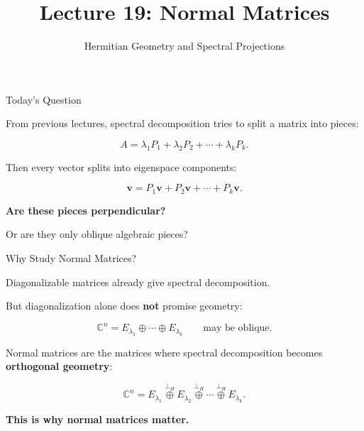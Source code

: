 \documentclass[10pt]{beamer}
\title{Lecture 19: Normal Matrices}
\subtitle{Hermitian Geometry and Spectral Projections}
\date{}
\theoremstyle{definition}
\newcommand{\x}[1]{\alert{\textbf{#1}}}
\newcommand{\orthoplus}{\mathbin{\overset{\perp_H}{\oplus}}}
\begin{document}
\begin{frame}[plain,shrink=10]
\titlepage
\end{frame}


\begin{frame}{Today's Question}

From previous lectures, spectral decomposition tries to split a matrix into pieces:

$$
A=\lambda_1P_1+\lambda_2P_2+\cdots+\lambda_kP_k.
$$

\vfill

Then every vector splits into eigenspace components:

$$
\mathbf{v}=P_1\mathbf{v}+P_2\mathbf{v}+\cdots+P_k\mathbf{v}.
$$

\vfill\pause

\begin{center}
{\Large \x{Are these pieces perpendicular?}}

\vspace{0.4cm}

{\Large Or are they only oblique algebraic pieces?}
\end{center}

\end{frame}


\begin{frame}{Why Study Normal Matrices?}

Diagonalizable matrices already give spectral decomposition.

\vfill

But diagonalization alone does \x{not} promise geometry:

$$
\mathbb{C}^n=E_{\lambda_1}\oplus\cdots\oplus E_{\lambda_k}
\qquad\text{may be oblique.}
$$

\vfill\pause

Normal matrices are the matrices where spectral decomposition becomes \x{orthogonal geometry}:

$$
\boxed{
\mathbb{C}^n
=E_{\lambda_1}\orthoplus E_{\lambda_2}\orthoplus\cdots\orthoplus E_{\lambda_k}.
}
$$

\vfill

\x{This is why normal matrices matter.}

\end{frame}
\end{document}
